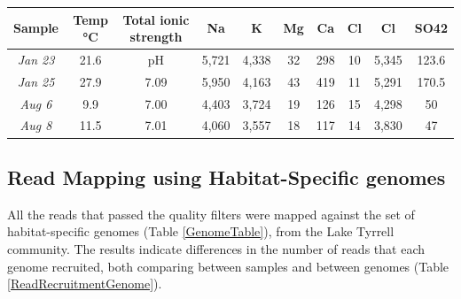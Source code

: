 \clearpage
\thispagestyle{facingcaption}
\begin{table}[h]
\captionsetup{labelformat=prev-page}
\caption{\textbf{Table \ref{LT_chemical}:} Physical and chemical composition of the Lake Tyrrell water samples. Concentrations are given in units of \si{\milli\mole\per\liter}}
\label{LT_chemical}
\end{table}
\clearpage

\begin{table}
\ContinuedFloat
\captionsetup{labelformat=empty}
\centering

\begin{tabular}{cccccccccc}

\textbf{Sample} & \textbf{Temp \si{\degreeCelsius}} & \textbf{Total ionic strength} & \textbf{Na} & \textbf{K} & \textbf{Mg} & \textbf{Ca} & \textbf{Cl} & \textbf{Cl} & \textbf{SO42} \\
\hline
\textit{Jan 23} & 21.6 & pH & 5,721 & 4,338 & 32 & 298 & 10 & 5,345 & 123.6 \\
\textit{Jan 25} & 27.9 & 7.09 & 5,950 & 4,163 & 43 & 419 & 11 & 5,291 & 170.5 \\
\textit{Aug 6} & 9.9 & 7.00 & 4,403 & 3,724 & 19 & 126 & 15 & 4,298 & 50 \\
\textit{Aug 8} & 11.5 & 7.01 & 4,060 & 3,557 & 18 & 117 & 14 & 3,830 & 47 \\

\end{tabular}
\end{table}


\clearpage
\subsection{Read Mapping using Habitat-Specific genomes}

All the reads that passed the quality filters were mapped against the set of habitat-specific genomes (Table \ref{GenomeTable}), from the Lake Tyrrell community. The results indicate differences in the number of reads that each genome recruited, both comparing between samples and between genomes (Table \ref{ReadRecruitmentGenome}). 

